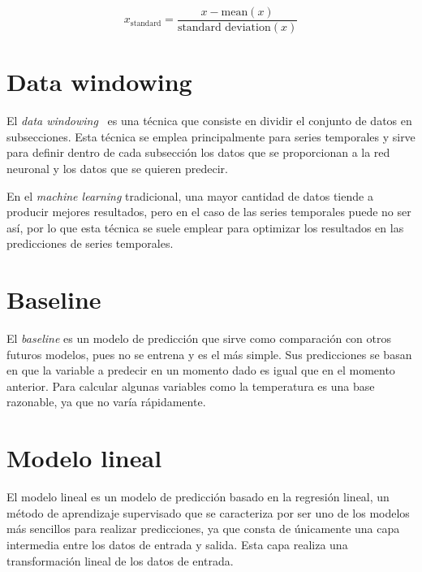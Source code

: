 \[x_{\text{standard}} = \frac{{x - \text{mean}(x)}}{{\text{standard deviation}(x)}}\]

\section{Data windowing}

El \textit{data windowing}~\cite{datawindowing} es una técnica que consiste en dividir el conjunto de datos en subsecciones. Esta técnica se emplea principalmente para series temporales y sirve para definir dentro de cada subsección los datos que se proporcionan a la red neuronal y los datos que se quieren predecir.

\par

En el \textit{machine learning} tradicional, una mayor cantidad de datos tiende a producir mejores resultados, pero en el caso de las series temporales puede no ser así, por lo que esta técnica se suele emplear para optimizar los resultados en las predicciones de series temporales.



\section{Baseline}

El \textit{baseline} es un modelo de predicción que sirve como comparación con otros futuros modelos, pues no se entrena y es el más simple. Sus predicciones se basan en que la variable a predecir en un momento dado es igual que en el momento anterior. Para calcular algunas variables como la temperatura es una base razonable, ya que no varía rápidamente.

\section{Modelo lineal}

El modelo lineal es un modelo de predicción basado en la regresión lineal, un método de aprendizaje supervisado que se caracteriza por ser uno de los modelos más sencillos para realizar predicciones, ya que consta de únicamente una capa intermedia entre los datos de entrada y salida. Esta capa realiza una transformación lineal de los datos de entrada.

